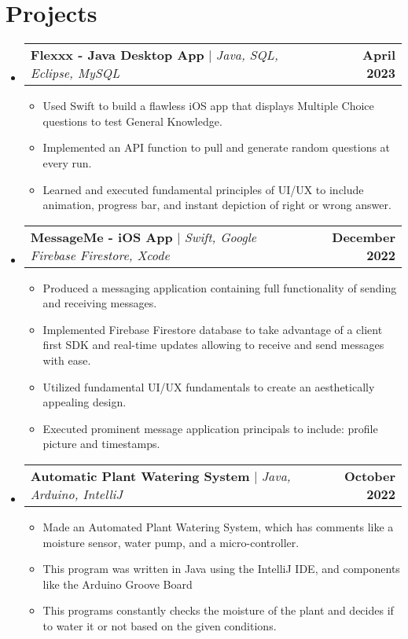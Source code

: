 \documentclass[letterpaper,11pt]{article}
\makeatletter
\newcommand{\resumeItem}[1]{
  \item\small{
    {#1 \vspace{-2pt}}
  }
}
\newcommand{\resumeProjectHeading}[2]{
    \item
    \begin{tabular*}{1.001\textwidth}{l@{\extracolsep{\fill}}r}
      \small#1 & \textbf{\small #2}\\
    \end{tabular*}\vspace{-7pt}
}
\newcommand{\resumeSubHeadingListStart}{\begin{itemize}[leftmargin=0.0in, label={}]}
\newcommand{\resumeSubHeadingListEnd}{\end{itemize}}
\newcommand{\resumeItemListStart}{\begin{itemize}}
\newcommand{\resumeItemListEnd}{\end{itemize}\vspace{-5pt}}
\makeatother
\begin{document}
\section{Projects}
    \vspace{-5pt}
    \resumeSubHeadingListStart
      \resumeProjectHeading
          {\textbf{Flexxx - Java Desktop App} $|$ \emph{Java, SQL, Eclipse, MySQL}}{April 2023}
          \resumeItemListStart
            \resumeItem{Used Swift to build a flawless iOS app that displays Multiple Choice questions to test General Knowledge.}
            \resumeItem{Implemented an API function to pull and generate random questions at every run.}
            \resumeItem{Learned and executed fundamental principles of UI/UX to include animation, progress bar, and instant
depiction of right or wrong answer.}
          \resumeItemListEnd 
          \vspace{-13pt}
           \resumeProjectHeading
          {\textbf{MessageMe - iOS App} $|$ \emph{Swift, Google Firebase Firestore, Xcode}}{December 2022}
          \resumeItemListStart
            \resumeItem{Produced a messaging application containing full functionality of sending and receiving messages.}
            \resumeItem{Implemented Firebase Firestore database to take advantage of a client first SDK and real-time updates allowing to receive and send messages with ease.}
            \resumeItem{Utilized fundamental UI/UX fundamentals to create an aesthetically appealing design. }
            \resumeItem{Executed prominent message application principals to include: profile picture and timestamps.}
          \resumeItemListEnd
          \vspace{-13pt}
          \resumeProjectHeading
          {\textbf{Automatic Plant Watering System} $|$ \emph{Java, Arduino, IntelliJ}}{October 2022}
          \resumeItemListStart
            \resumeItem{Made an Automated Plant Watering System, which has comments like a moisture sensor, water pump, and a micro-controller.}
            \resumeItem{This program was written in Java using the IntelliJ IDE, and components like the Arduino Groove Board}
            \resumeItem{This programs constantly checks the moisture of the plant and decides if to water it or not based on the given
conditions.}
          \resumeItemListEnd 
    \resumeSubHeadingListEnd
\vspace{-15pt}


%
\end{document}
